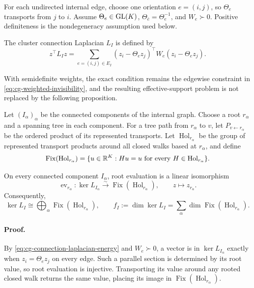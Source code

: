For each undirected internal edge, choose one orientation \(e=(i,j)\), so
\(\Theta_e\) transports from \(j\) to \(i\). Assume
\(\Theta_e\in\mathrm{GL}(K)\), \(\Theta_{\bar e}=\Theta_e^{-1}\), and
\(W_e\succ0\). Positive definiteness is the nondegeneracy assumption used
below. 

The cluster connection Laplacian \(L_I\) is defined by
\begin{equation}
z^\top L_Iz
=\sum_{e=(i,j)\in E_I}
(z_i-\Theta_ez_j)^\top W_e(z_i-\Theta_ez_j).
\label{eq:cg-connection-laplacian-energy}
\end{equation}

With semidefinite weights, the exact condition remains the edgewise constraint
in \eqref{eq:cg-weighted-invisibility}, and the resulting effective-support
problem is not replaced by the following proposition. 

Let \((I_\alpha)_\alpha\) be the connected components of the internal graph.
Choose a root \(r_\alpha\) and a spanning tree in each component. For a tree
path from \(r_\alpha\) to \(v\), let \(P_{v\leftarrow r_\alpha}\) be the
ordered product of its represented transports. Let
\(\operatorname{Hol}_{r_\alpha}\) be the group of represented transport
products around all closed walks based at \(r_\alpha\), and define
\begin{equation}
\operatorname{Fix}(\operatorname{Hol}_{r_\alpha})
=\{u\in\mathbb R^K:Hu=u\text{ for every }
H\in\operatorname{Hol}_{r_\alpha}\}.
\label{eq:cg-holonomy-fixed-space}
\end{equation}

On every connected component \(I_\alpha\), root evaluation is a linear
isomorphism
\begin{equation}
\operatorname{ev}_{r_\alpha}:\ker L_{I_\alpha}
\xrightarrow{\sim}
\operatorname{Fix}(\operatorname{Hol}_{r_\alpha}),
\qquad z\longmapsto z_{r_\alpha}.
\label{eq:cg-kernel-holonomy-isomorphism}
\end{equation}
Consequently,
\begin{equation}
\ker L_I\cong
\bigoplus_\alpha\operatorname{Fix}(\operatorname{Hol}_{r_\alpha}),
\qquad
f_I:=\dim\ker L_I
=\sum_\alpha\dim\operatorname{Fix}
(\operatorname{Hol}_{r_\alpha}).
\label{eq:cg-fixed-rank}
\end{equation}

\paragraph{Proof.}
By \eqref{eq:cg-connection-laplacian-energy} and \(W_e\succ0\), a vector is
in \(\ker L_{I_\alpha}\) exactly when
\(z_i=\Theta_ez_j\) on every edge. Such a parallel section is determined by
its root value, so root evaluation is injective. Transporting its value
around any rooted closed walk returns the same value, placing its image in
\(\operatorname{Fix}(\operatorname{Hol}_{r_\alpha})\).

